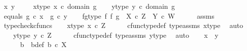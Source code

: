 \begin{isabellebody}
\ x\ y\ \isanewline
\ \ \isamarkupfalse%
\ x{\isacharunderscore}{\kern0pt}type{\isacharcolon}{\kern0pt}\ {\isachardoublequoteopen}x\ {\isasymin}\isactrlsub c\ domain\ g{\isachardoublequoteclose}\isanewline
\ \ \isamarkupfalse%
\ y{\isacharunderscore}{\kern0pt}type{\isacharcolon}{\kern0pt}\ {\isachardoublequoteopen}y\ {\isasymin}\isactrlsub c\ domain\ g{\isachardoublequoteclose}\isanewline
\ \ \isamarkupfalse%
\ equals{\isacharcolon}{\kern0pt}\ {\isachardoublequoteopen}g\ {\isasymcirc}\isactrlsub c\ x\ {\isacharequal}{\kern0pt}\ g\ {\isasymcirc}\isactrlsub c\ y{\isachardoublequoteclose}\isanewline
\ \ \isamarkupfalse%
\ fg{\isacharunderscore}{\kern0pt}type{\isacharcolon}{\kern0pt}\ {\isachardoublequoteopen}f\ {\isasymtimes}\isactrlsub f\ g\ {\isacharcolon}{\kern0pt}\ X\ {\isasymtimes}\isactrlsub c\ Z\ {\isasymrightarrow}\ Y\ {\isasymtimes}\isactrlsub c\ W{\isachardoublequoteclose}\isanewline
\ \ \ \ \isamarkupfalse%
\ assms\ \isamarkupfalse%
\ typecheck{\isacharunderscore}{\kern0pt}cfuncs\isanewline
\ \ \isamarkupfalse%
\ x{\isacharunderscore}{\kern0pt}type{}{\isacharcolon}{\kern0pt}\ {\isachardoublequoteopen}x\ {\isasymin}\isactrlsub c\ Z{\isachardoublequoteclose}\isanewline
\ \ \ \ \isamarkupfalse%
\ cfunc{\isacharunderscore}{\kern0pt}type{\isacharunderscore}{\kern0pt}def\ type{\isacharunderscore}{\kern0pt}assms{\isacharparenleft}{\kern0pt}{}{\isacharparenright}{\kern0pt}\ x{\isacharunderscore}{\kern0pt}type\ \isamarkupfalse%
\ auto\isanewline
\ \ \isamarkupfalse%
\ y{\isacharunderscore}{\kern0pt}type{}{\isacharcolon}{\kern0pt}\ {\isachardoublequoteopen}y\ {\isasymin}\isactrlsub c\ Z{\isachardoublequoteclose}\isanewline
\ \ \ \ \isamarkupfalse%
\ cfunc{\isacharunderscore}{\kern0pt}type{\isacharunderscore}{\kern0pt}def\ type{\isacharunderscore}{\kern0pt}assms{\isacharparenleft}{\kern0pt}{}{\isacharparenright}{\kern0pt}\ y{\isacharunderscore}{\kern0pt}type\ \isamarkupfalse%
\ auto\isanewline
\ \ \isamarkupfalse%
\ {\isachardoublequoteopen}x\ {\isacharequal}{\kern0pt}\ y{\isachardoublequoteclose}\isanewline
\ \ \isamarkupfalse%
\ {\isacharminus}{\kern0pt}\ \isanewline
\ \ \ \ \isamarkupfalse%
\ b\ \ b{\isacharunderscore}{\kern0pt}def{\isacharcolon}{\kern0pt}\ {\isachardoublequoteopen}b\ {\isasymin}\isactrlsub c\ X{\isachardoublequoteclose}\isanewline

\end{isabellebody}
